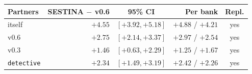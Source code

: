 \begin{tabular}{lrcrc}
\toprule
Partners & SESTINA $-$ v0.6 & 95\% CI & Per bank & Repl. \\
\midrule
itself & $+4.55$ & $[+3.92, +5.18]$ & $+4.88$ / $+4.21$ & yes \\
v0.6 & $+2.75$ & $[+2.14, +3.37]$ & $+2.97$ / $+2.54$ & yes \\
v0.3 & $+1.46$ & $[+0.63, +2.29]$ & $+1.25$ / $+1.67$ & yes \\
\texttt{detective} & $+2.34$ & $[+1.49, +3.19]$ & $+2.42$ / $+2.26$ & yes \\
\bottomrule
\end{tabular}
